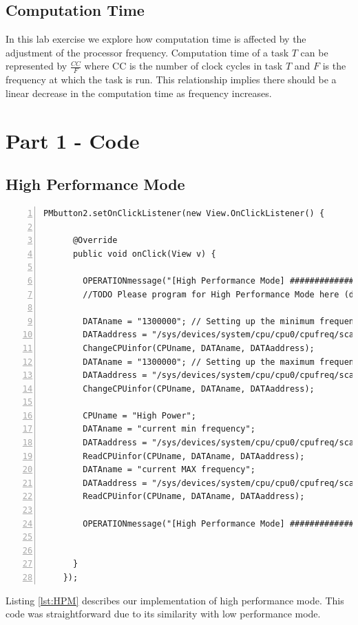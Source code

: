 \documentclass{article} %
\begin{document}
\subsection{Computation Time}
In this lab exercise we explore how computation time is affected by the adjustment of the processor frequency.
Computation time of a task $T$ can be represented by $\frac{CC}{F}$ where CC is the number of clock cycles in task $T$ and $F$ is the frequency at which the task is run.
This relationship implies there should be a linear decrease in the computation time as frequency increases.

\section{Part 1 - Code}
\subsection{High Performance Mode}
\begin{lstlisting}[float=*, caption={High Performance Mode},label={lst:HPM},numbers=left]
PMbutton2.setOnClickListener(new View.OnClickListener() {

      @Override
      public void onClick(View v) {

        OPERATIONmessage("[High Performance Mode] ###########################################");
        //TODO Please program for High Performance Mode here (done)

        DATAname = "1300000"; // Setting up the minimum frequency 1300 Mhz
        DATAaddress = "/sys/devices/system/cpu/cpu0/cpufreq/scaling_min_freq";
        ChangeCPUinfor(CPUname, DATAname, DATAaddress);
        DATAname = "1300000"; // Setting up the maximum frequency at 1300 MHz
        DATAaddress = "/sys/devices/system/cpu/cpu0/cpufreq/scaling_max_freq";
        ChangeCPUinfor(CPUname, DATAname, DATAaddress);

        CPUname = "High Power";
        DATAname = "current min frequency";
        DATAaddress = "/sys/devices/system/cpu/cpu0/cpufreq/scaling_min_freq";
        ReadCPUinfor(CPUname, DATAname, DATAaddress);
        DATAname = "current MAX frequency";
        DATAaddress = "/sys/devices/system/cpu/cpu0/cpufreq/scaling_max_freq";
        ReadCPUinfor(CPUname, DATAname, DATAaddress);

        OPERATIONmessage("[High Performance Mode] ###########################################");


      }
    });
\end{lstlisting}
Listing \ref{lst:HPM} describes our implementation of high performance mode. This code was straightforward due to its similarity with low performance mode.
\end{document}
